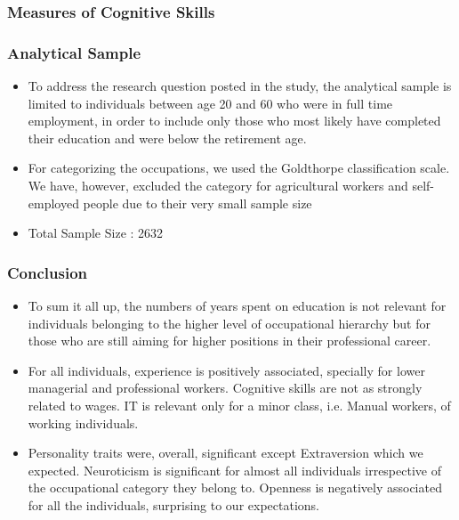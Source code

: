 \documentclass[11pt]{beamer}
\begin{document}
\begin{frame}[t]
	\frametitle{Measures of Cognitive Skills}
	 \begin{itemize}
	\end{itemize}
\end{frame}

\begin{frame}[t]
	\frametitle{Analytical Sample}
	 \begin{itemize}
	 	\item To address the research question posted in the study, the analytical
sample is limited to individuals between age 20 and 60 who were in
full time employment, in order to include only those who most likely
have completed their education and were below the retirement age.

		\item For categorizing the occupations, we used the Goldthorpe
classification scale. We have, however, excluded the category for
agricultural workers and self-employed people due to their very small
sample size

		\item Total Sample Size : 2632
	\end{itemize}
\end{frame}

\begin{frame}[t]
	\frametitle{Conclusion}
	 \begin{itemize}
		\item To sum it all up, the numbers of years spent on education is not relevant
for individuals belonging to the higher level of occupational hierarchy but
for those who are still aiming for higher positions in their professional
career.

		\item For all individuals, experience is positively associated, specially for lower
managerial and professional workers. Cognitive skills are not as strongly
related to wages. IT is relevant only for a minor class, i.e. Manual workers,
of working individuals.

		\item Personality traits were, overall, significant except Extraversion which we
expected. Neuroticism is significant for almost all individuals irrespective of
the occupational category they belong to. Openness is negatively
associated for all the individuals, surprising to our expectations.
	\end{itemize}
\end{frame}
\end{document}
